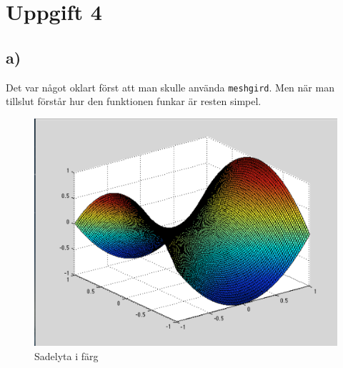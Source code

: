 \documentclass[a4paper,11pt]{article}
\begin{document}
    \section*{Uppgift 4}
    \subsection*{a)}
    Det var något oklart först att man skulle använda \verb=meshgird=.
    Men när man tillslut förstår hur den funktionen funkar är resten simpel.
    \begin{figure}
        \includegraphics[width=\textwidth]{ex4a.png}
        \caption{Sadelyta i färg}
    \end{figure}
    \begin{samepage}
    \end{samepage}
\end{document}
